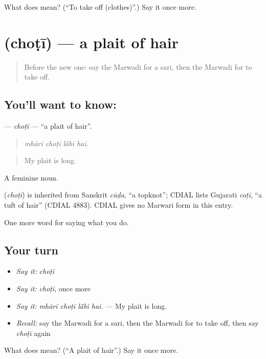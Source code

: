 \begin{tcolorbox}[breakable,colback=teal!4,colframe=teal!35!black,title={Before you move on}]
What does  mean? (\textquotedblleft{}To take off (clothes)\textquotedblright{}.) Say it once more.
\end{tcolorbox}
\section[\texorpdfstring{\mw{चोटी} (choṭī)}{चोटी (choṭī)}]{ (choṭī) — a plait of hair}

\label{lesson:MW-C174-choti}



\begin{quote}
Before the new one: say the Marwadi for a sari, then the Marwadi for to take off.
\end{quote}

\subsection*{You'll want to know: }
\textbf{} — \emph{choṭī} — \textquotedblleft{}a plait of hair\textquotedblright{}.

\begin{quote}
   
\end{quote}

\begin{quote}
\emph{mhārī choṭī lā̃bī hai.}
\end{quote}

\begin{quote}
My plait is long.
\end{quote}

A feminine noun.

\begin{cousinweb}
\textbf{} (\emph{choṭī}) is inherited from Sanskrit \emph{cūḍa}, \textquotedblleft{}a topknot\textquotedblright{}; CDIAL lists Gujarati \emph{coṭī}, \textquotedblleft{}a tuft of hair\textquotedblright{} (CDIAL 4883). CDIAL gives no Marwari form in this entry.
\end{cousinweb}

\begin{grammarlens}[title={What you've built}]
One more word for saying what you do.
\end{grammarlens}

\subsection*{Your turn}
\begin{itemize}
\raggedright
  \item \emph{Say it:} \emph{choṭī}
  \item \emph{Say it:} \emph{choṭī}, once more
  \item \emph{Say it:} \emph{mhārī choṭī lā̃bī hai.} — My plait is long.
  \item \emph{Recall:} say the Marwadi for a sari, then the Marwadi for to take off, then say \emph{choṭī} again
\end{itemize}

\begin{tcolorbox}[breakable,colback=teal!4,colframe=teal!35!black,title={Before you move on}]
What does  mean? (\textquotedblleft{}A plait of hair\textquotedblright{}.) Say it once more.
\end{tcolorbox}
